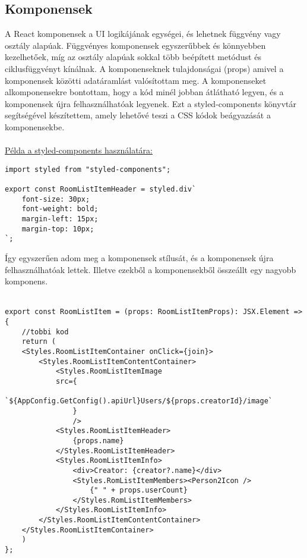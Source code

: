 \subsection*{Komponensek}
A React komponensek a UI logikájának egységei, és lehetnek függvény vagy osztály alapúak. Függvényes komponensek egyszerűbbek és könnyebben kezelhetőek, míg az osztály alapúak sokkal több beépített metódust és ciklusfüggvényt kínálnak.
A komponenseknek tulajdonságai (props) amivel a komponensek közötti adatáramlást valósítottam meg.
A komponenseket alkomponensekre bontottam, hogy a kód minél jobban átlátható legyen, és a komponensek újra felhasználhatóak legyenek.
Ezt a  styled-components \cite[]{styled-components} könyvtár segítségével készítettem, amely lehetővé teszi a CSS kódok beágyazását a komponensekbe.
\\
\\
\underline{Példa a styled-components használatára:}
\begin{lstlisting}[style=es6,caption={Styled-components}]
import styled from "styled-components";

export const RoomListItemHeader = styled.div`
    font-size: 30px;
    font-weight: bold;
    margin-left: 15px;
    margin-top: 10px;
`;

\end{lstlisting}
\vspace{1em}
Így egyszerűen adom meg a komponensek stílusát, és a komponensek újra felhasználhatóak lettek.
Illetve ezekből a komponensekből összeállt egy nagyobb komponens.
\\
\\
\begin{lstlisting}[style=es6,caption={RoomListItem komponens}]
export const RoomListItem = (props: RoomListItemProps): JSX.Element => {
    //tobbi kod
    return (
    <Styles.RoomListItemContainer onClick={join}>
        <Styles.RoomListItemContentContainer>
            <Styles.RoomListItemImage
            src={
            `${AppConfig.GetConfig().apiUrl}Users/${props.creatorId}/image`
                }
                />
            <Styles.RoomListItemHeader>
                {props.name}
            </Styles.RoomListItemHeader>
            <Styles.RoomListItemInfo>
                <div>Creator: {creator?.name}</div>
                <Styles.RomListItemMembers><Person2Icon />
                    {" " + props.userCount} 
                </Styles.RomListItemMembers>
            </Styles.RoomListItemInfo>
        </Styles.RoomListItemContentContainer>
    </Styles.RoomListItemContainer>
    )
};
\end{lstlisting}
\vspace{1em}
